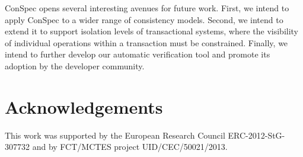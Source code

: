 \documentclass[journal, compsoc]{IEEEtran}
\begin{document}
	ConSpec opens several interesting avenues for future work. First, we intend to apply ConSpec to a wider range of consistency models. Second, we intend to extend it to support isolation levels of transactional systems, where the visibility of individual operations within a transaction must be constrained. Finally, we intend to further develop our automatic verification tool and promote its adoption by the developer community.
	
	
	\section*{Acknowledgements}
	
	This work was supported by the European Research Council ERC-2012-StG-307732 and by FCT/MCTES project UID/CEC/50021/2013.
	
	
	
	
	
	
\end{document}
